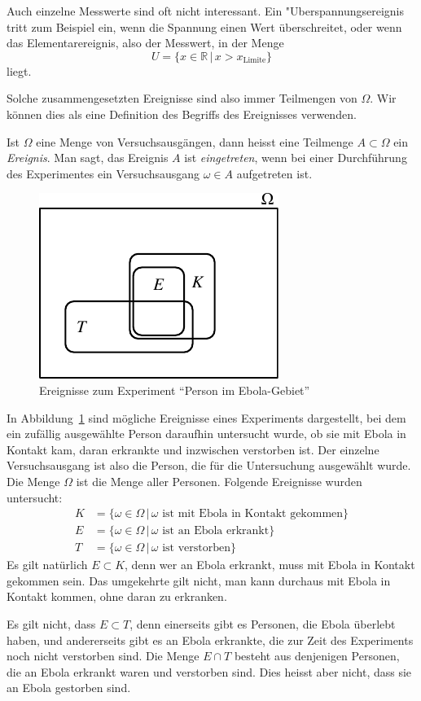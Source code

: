 Auch einzelne Messwerte sind oft nicht interessant.
Ein "Uberspannungsereignis tritt zum Beispiel ein, wenn die Spannung
einen Wert überschreitet, oder wenn das Elementarereignis, also der Messwert,
in der Menge
\[
U=
\{x\in\mathbb R\,|\, x > x_{\text{Limite}}\}
\]
liegt.

Solche zusammengesetzten Ereignisse sind also immer Teilmengen von $\Omega$.
Wir können dies als eine Definition des Begriffs des Ereignisses
verwenden.

\begin{definition}
Ist $\Omega$ eine Menge von Versuchsausgängen, dann heisst eine Teilmenge
$A\subset\Omega$ ein {\em Ereignis}.
Man sagt, das Ereignis $A$ ist {\em eingetreten}, wenn bei einer Durchführung des
Experimentes ein Versuchsausgang $\omega\in A$ aufgetreten ist.
\end{definition}

\begin{beispiel}
\begin{figure}
\centering
\includegraphics{images/ebola-1.pdf}
\caption{Ereignisse zum Experiment ``Person im Ebola-Gebiet''
\label{image-ebola}}
\end{figure}

In Abbildung~\ref{image-ebola} sind mögliche Ereignisse eines Experiments
dargestellt, bei dem ein zufällig ausgewählte Person daraufhin untersucht
wurde, ob sie mit Ebola in Kontakt kam, daran erkrankte und inzwischen
verstorben ist.
Der einzelne Versuchsausgang ist also die Person, die für die
Untersuchung ausgewählt wurde.
Die Menge $\Omega$ ist die Menge aller Personen.
Folgende Ereignisse wurden untersucht:
\begin{align*}
K&=\{\omega\in\Omega\,|\,\text{$\omega$ ist mit Ebola in Kontakt gekommen}\}
\\
E&=\{\omega\in\Omega\,|\,\text{$\omega$ ist an Ebola erkrankt}\}
\\
T&=\{\omega\in\Omega\,|\,\text{$\omega$ ist verstorben}\}
\end{align*}
Es gilt natürlich $E\subset K$, denn wer an Ebola erkrankt, muss mit
Ebola in Kontakt gekommen sein.
Das umgekehrte gilt nicht, man kann durchaus mit Ebola in Kontakt
kommen, ohne daran zu erkranken.

Es gilt nicht, dass $E\subset T$, denn einerseits gibt es Personen, die
Ebola überlebt haben, und andererseits gibt es an Ebola erkrankte,
die zur Zeit des Experiments noch nicht verstorben sind.
Die Menge $E\cap T$ besteht aus denjenigen Personen, die an Ebola
erkrankt waren und verstorben sind.
Dies heisst aber nicht, dass sie an Ebola gestorben sind.
\end{beispiel}

